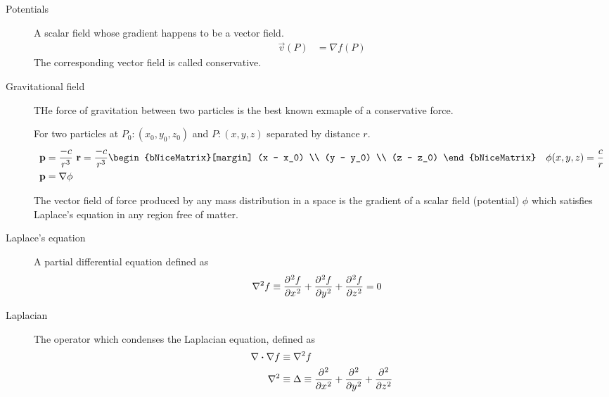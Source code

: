 \begin{description}
    \item[Potentials] A scalar field whose gradient happens to be a vector field.
        \begin{align}
            \vec{v}(P) & = \nabla f(P)
        \end{align}
        The corresponding vector field is called conservative.

    \item[Gravitational field] THe force of gravitation between two particles is the best
        known exmaple of a conservative force. \par
        For two particles at $ P_0: (x_0, y_0, z_0) $ and $ P: (x, y, z) $ separated by
        distance $ r $.
        \begin{align}
            \vec{p}                                      & = \frac{-c}{r^3}\ \vec{r}
            = \frac{-c}{r^3} \begin{bNiceMatrix}[margin]
                                 (x - x_0) \\ (y - y_0) \\ (z - z_0)
                             \end{bNiceMatrix} &
            \phi(x, y, z)                                & = \frac{c}{r}             \\
            \vec{p}                                      & = \nabla \phi
        \end{align}

        The vector field of force produced by any mass distribution in a space is the
        gradient of a scalar field (potential) $ \phi $ which satisfies Laplace's
        equation in any region free of matter.

    \item[Laplace's equation] A partial differential equation defined as
        \begin{align}
            \nabla^2 f & \equiv \diffp[2] fx + \diffp[2] fy + \diffp[2] fz = 0
        \end{align}

    \item[Laplacian] The operator which condenses the Laplacian equation, defined as
        \begin{align}
            \nabla \dotp \nabla f & \equiv \nabla^2 f              \\
            \nabla^2              & \equiv \Delta \equiv \diffp[2]
            {}{x} + \diffp[2] {}{y} + \diffp[2] {}{z}
        \end{align}
\end{description}

